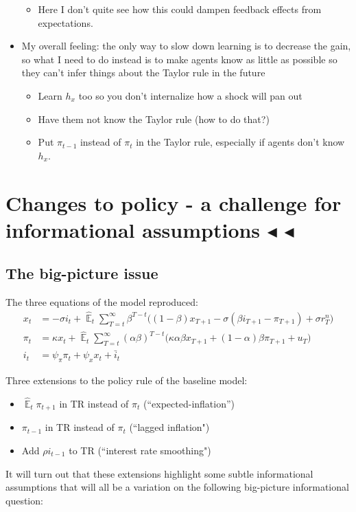 \documentclass[11pt]{article}
\renewcommand{\[}{\begin{equation}}
\renewcommand{\]}{\end{equation}}
\DeclareMathOperator{\E}{\mathbb{E}}
\begin{document}
\begin{itemize}
\begin{itemize}
\item Here I don't quite see how this could dampen feedback effects from expectations.
\end{itemize}
\item My overall feeling: the only way to slow down learning is to decrease the gain, so what I need to do instead is to make agents know as little as possible so they can't infer things about the Taylor rule in the future
\begin{itemize}
\item Learn $h_x$ too so you don't internalize how a shock will pan out
\item Have them not know the Taylor rule (how to do that?)
\item Put $\pi_{t-1}$ instead of $\pi_t$ in the Taylor rule, especially if agents don't know $h_x$.
\end{itemize}

\end{itemize}


\section{Changes to policy - a challenge for informational assumptions $\blacktriangleleft$ $\blacktriangleleft$}
\subsection{The big-picture issue}
The three equations of the model reproduced:
\begin{align*}
x_t &=  -\sigma i_t +\hat{\E}_t \sum_{T=t}^{\infty} \beta^{T-t }\big( (1-\beta)x_{T+1} - \sigma(\beta i_{T+1} - \pi_{T+1}) +\sigma r_T^n \big)   \\
\pi_t &= \kappa x_t +\hat{\E}_t \sum_{T=t}^{\infty} (\alpha\beta)^{T-t }\big( \kappa \alpha \beta x_{T+1} + (1-\alpha)\beta \pi_{T+1} + u_T\big)  \\
i_t &= \psi_{\pi}\pi_t + \psi_{x} x_t   + \bar{i}_t 
\end{align*}

Three extensions to the policy rule of the baseline model:
\begin{itemize}
\item $\hat{\E}_t\pi_{t+1}$ in TR instead of $\pi_t$ (``expected-inflation'')
\item $\pi_{t-1}$ in TR instead of $\pi_t$ (``lagged inflation")
\item Add $\rho i_{t-1}$ to TR (``interest rate smoothing")
\end{itemize}
It will turn out that these extensions highlight some subtle informational assumptions that will all be a variation on the following big-picture informational question:
\end{document}
